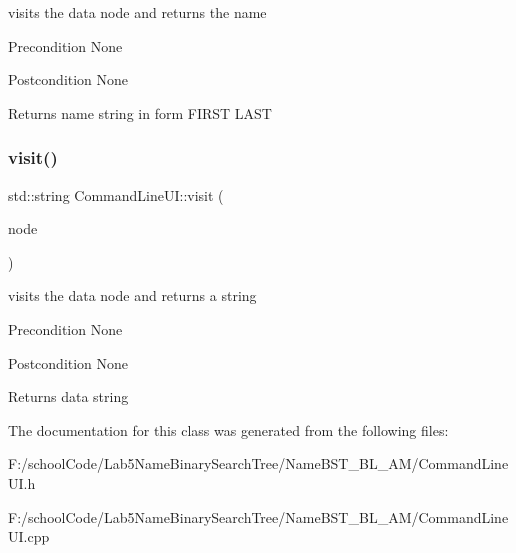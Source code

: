 visits the data node and returns the name \begin{DoxyPrecond}{Precondition}
None 
\end{DoxyPrecond}
\begin{DoxyPostcond}{Postcondition}
None 
\end{DoxyPostcond}
\begin{DoxyReturn}{Returns}
name string in form F\+I\+R\+ST L\+A\+ST 
\end{DoxyReturn}
\mbox{\label{class_command_line_u_i_aa3aa6bc65288fac3cdfa611094ab7646}} 
\subsubsection{\texorpdfstring{visit()}{visit()}}
{\footnotesize\ttfamily std\+::string Command\+Line\+U\+I\+::visit (\begin{DoxyParamCaption}\item[{\hyperlink{class_node_main}{Node\+Main} $\ast$}]{node }\end{DoxyParamCaption})\hspace{0.3cm}{\ttfamily [static]}}

visits the data node and returns a string \begin{DoxyPrecond}{Precondition}
None 
\end{DoxyPrecond}
\begin{DoxyPostcond}{Postcondition}
None 
\end{DoxyPostcond}
\begin{DoxyReturn}{Returns}
data string 
\end{DoxyReturn}


The documentation for this class was generated from the following files\+:\begin{DoxyCompactItemize}
\item 
F\+:/school\+Code/\+Lab5\+Name\+Binary\+Search\+Tree/\+Name\+B\+S\+T\+\_\+\+B\+L\+\_\+\+A\+M/Command\+Line\+U\+I.\+h\item 
F\+:/school\+Code/\+Lab5\+Name\+Binary\+Search\+Tree/\+Name\+B\+S\+T\+\_\+\+B\+L\+\_\+\+A\+M/Command\+Line\+U\+I.\+cpp\end{DoxyCompactItemize}
